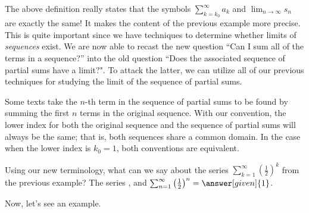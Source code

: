 \documentclass{ximera}
\begin{document}
The above definition really states that the symbols $\sum_{k=k_0}^{\infty} a_k$ and $\lim_{n \to \infty} s_n$ are exactly the same! It makes the content of the previous example more precise.  This is quite important since we have techniques to determine whether limits of \emph{sequences} exist.  We are now able to recast the new question ``Can I sum all of the terms in a sequence?'' into the old question ``Does the associated sequence of partial sums have a limit?".  To attack the latter, we can utilize all of our previous techniques for studying the limit of the sequence of partial sums.

\begin{remark}
Some texts take the $n$-th term in the sequence of partial sums to be found by summing the first $n$ terms in the original sequence.  With our convention, the lower index for both the original sequence and the sequence of partial sums will always be the same; that is, both sequences share a common domain.  In the case when the lower index is $k_0=1$, both conventions are equivalent.
\end{remark}

\begin{question}
  Using our new terminology, what can we say about the series $\sum_{k=1}^\infty \left(\frac{1}{2}\right)^k$ from the previous example?  The series     , and
      $\sum_{n=1}^\infty \left(\frac{1}{2}\right)^n = \answer[given]{1}$.
  \end{question}

Now, let's see an example.
\end{document}

